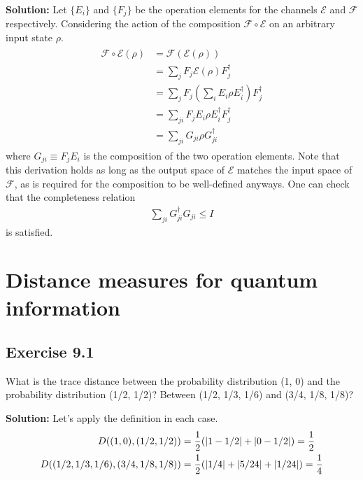 \documentclass{book}
\newcommand{\mc}[1]{\mathcal{#1}}
\begin{document}
    \textbf{Solution:} Let $\{E_i\}$ and $\{F_j\}$ be the operation elements for the channels $\mc{E}$ and $\mc{F}$ respectively. Considering the action of the composition $\mc{F} \circ \mc{E}$ on an arbitrary input state $\rho$.
    \begin{align}
    \begin{aligned}
        \mc{F}\circ\mc{E} (\rho) &= \mc{F}(\mc{E}(\rho)) \\
        &= \sum_j F_j \mc{E}(\rho) F_j^\dagger \\
        &= \sum_j F_j \left(\sum_i E_i \rho E_i^\dagger \right) F_j^\dagger \\
        &= \sum_{ji} F_j E_i \rho E_i^\dagger F_j^\dagger \\
        &= \sum_{ji} G_{ji} \rho G_{ji}^\dagger 
    \end{aligned}
    \end{align}
    where $G_{ji} \equiv F_j E_i$ is the composition of the two operation elements. Note that this derivation holds as long as the output space of $\mc{E}$ matches the input space of $\mc{F}$, as is required for the composition to be well-defined anyways. One can check that the completeness relation
    \begin{align}
        \sum_{ji}G_{ji}^\dagger G_{ji} \leq I 
    \end{align}
    is satisfied.

\chapter{Distance measures for quantum information}

\section*{Exercise 9.1}
    What is the trace distance between the probability distribution (1, 0) and the probability distribution (1/2, 1/2)? Between (1/2, 1/3, 1/6) and (3/4, 1/8, 1/8)?
    
    \textbf{Solution:} Let's apply the definition in each case.
    \begin{align}
    \begin{aligned}
        D((1,0), (1/2,1/2)) &= \frac{1}{2} (\abs{1-1/2}+\abs{0-1/2}) = \frac{1}{2}\\
        D((1/2,1/3,1/6), (3/4,1/8,1/8)) &= \frac{1}{2} (\abs{1/4} + \abs{5/24}+\abs{1/24}) = \frac{1}{4}
    \end{aligned}
    \end{align}
    
\end{document}
